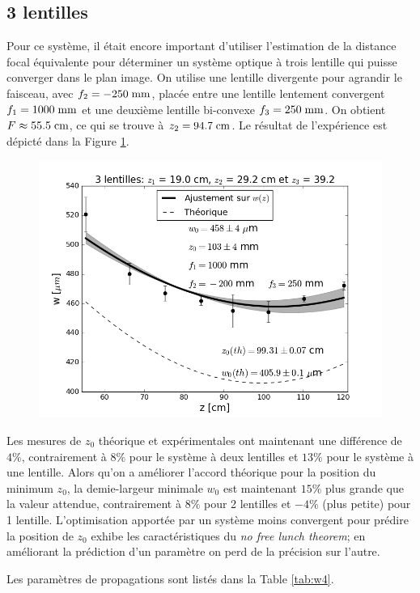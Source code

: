 \documentclass[10pt,letterpaper,twocolumn]{article}
\newcommand{\s}{\hspace{0.1cm}}
\begin{document}
\subsection{3 lentilles}
Pour ce système, il était encore important d'utiliser l'estimation de la distance focal équivalente pour déterminer un système optique à trois lentille qui puisse converger dans le plan image. On utilise une lentille divergente pour agrandir le faisceau, avec ${f_2 = -250\s \text{mm}}$, placée entre une lentille lentement convergent ${f_1 = 1000\s \text{mm}}$ et une deuxième lentille bi-convexe ${f_3 = 250\s \text{mm}}$. On obtient $F \approx 55.5\s \text{cm}$, ce qui se trouve à $z_2 = 94.7\s \text{cm}$. Le résultat de l'expérience est dépicté dans la Figure \ref{fig:w4}.
\begin{figure}[H]
	\centering
	\includegraphics[width=\linewidth]{figures/w4.png}
	\caption{}
	\label{fig:w4}
\end{figure}
Les mesures de $z_0$ théorique et expérimentales ont maintenant une différence de $4\%$, contrairement à $8\%$ pour le système à deux lentilles et $13\%$ pour le système à une lentille. Alors qu'on a améliorer l'accord théorique pour la position du minimum $z_0$, la demie-largeur minimale $w_0$ est maintenant $15\%$ plus grande que la valeur attendue, contrairement à $8\%$ pour 2 lentilles et $-4\%$ (plus petite) pour 1 lentille. L'optimisation apportée par un système moins convergent pour prédire la position de $z_0$ exhibe les caractéristiques du \textit{no free lunch theorem}; en améliorant la prédiction d'un paramètre on perd de la précision sur l'autre.\par
Les paramètres de propagations sont listés dans la Table \ref{tab:w4}.
\end{document}
